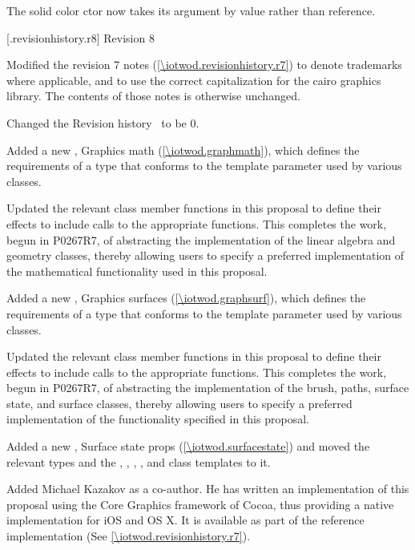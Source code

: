 \pnum
The solid color  ctor now takes its  argument by value rather than reference.

 [\iotwod.revisionhistory.r8] {Revision 8}

\pnum
Modified the revision 7 notes (\ref{\iotwod.revisionhistory.r7}) to denote trademarks where applicable, and to use the correct capitalization for the cairo graphics library. The contents of those notes is otherwise unchanged.

\pnum
Changed the Revision history \clause{}\, to be \clause{} 0.

\pnum
Added a new \clause, Graphics math (\ref{\iotwod.graphmath}), which defines the requirements of a type that conforms to the \graphicsmathtemplparam template parameter used by various classes.

\pnum
Updated the relevant class member functions in this proposal to define their effects to include calls to the appropriate \graphicsmathtemplparam functions. This completes the work, begun in P0267R7, of abstracting the implementation of the linear algebra and geometry classes, thereby allowing users to specify a preferred implementation of the mathematical functionality used in this proposal.

\pnum
Added a new \clause{}, Graphics surfaces (\ref{\iotwod.graphsurf}), which defines the requirements of a type that conforms to the \graphicssurfacestemplparam template parameter used by various classes.

\pnum
Updated the relevant class member functions in this proposal to define their effects to include calls to the appropriate \graphicssurfacestemplparam functions. This completes the work, begun in P0267R7, of abstracting the implementation of the brush, paths, surface state, and surface classes, thereby allowing users to specify a preferred implementation of the functionality specified in this proposal.

\pnum
Added a new \clause, Surface state props (\ref{\iotwod.surfacestate}) and moved the relevant  types and the , , , , and  class templates to it. 

\pnum
Added Michael Kazakov as a co-author. He has written an implementation of this proposal using the Core Graphics framework of Cocoa\textregistered{}, thus providing a native implementation for iOS\textregistered{} and OS X\textregistered{}. It is available as part of the reference implementation (See \ref{\iotwod.revisionhistory.r7}).

